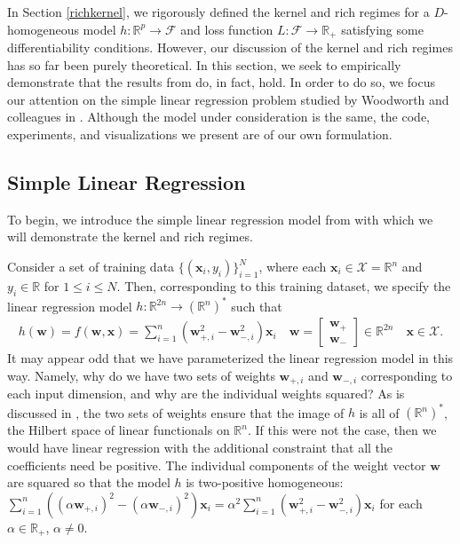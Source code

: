 \documentclass{article}
\begin{document}
In Section \ref{richkernel}, we rigorously defined the kernel and rich regimes for a $D$-homogeneous model $h: \mathbb{R}^p \rightarrow \mathcal{F}$ and loss function $L: \mathcal{F} \rightarrow \mathbb{R}_+$ satisfying some differentiability conditions. However, our discussion of the kernel and rich regimes has so far been purely theoretical. In this section, we seek to empirically demonstrate that the results from \cite{chizat2018lazy} do, in fact, hold. In order to do so, we focus our attention on the simple linear regression problem studied by Woodworth and colleagues in \cite{woodworth2020kernel}. Although the model under consideration is the same, the code, experiments, and visualizations we present are of our own formulation.

\subsection{Simple Linear Regression}\label{linregmodel}

To begin, we introduce the simple linear regression model from \cite{woodworth2020kernel} with which we will demonstrate the kernel and rich regimes.

Consider a set of training data $\{ (\boldsymbol{x}_i, y_i)\}_{i=1}^N$, where each $\boldsymbol{x}_i \in \mathcal{X} = \mathbb{R}^n$ and $y_i \in \mathbb{R}$ for $1 \leq i \leq N$. Then, corresponding to this training dataset, we specify the linear regression model $h: \mathbb{R}^{2n} \rightarrow (\mathbb{R}^n)^*$ such that
\begin{align}\label{linreg}
    h(\boldsymbol{w}) = f(\boldsymbol{w}, \boldsymbol{x}) = \sum_{i=1}^n(\boldsymbol{w}_{+, i}^2 - \boldsymbol{w}_{-, i}^2)\boldsymbol{x}_i \quad 
    \boldsymbol{w} = 
    \begin{bmatrix}
        \boldsymbol{w}_+ \\
        \boldsymbol{w}_-
    \end{bmatrix} 
    \in \mathbb{R}^{2n} \quad \boldsymbol{x} \in \mathcal{X}.
\end{align}
It may appear odd that we have parameterized the linear regression model in this way. Namely, why do we have two sets of weights $\boldsymbol{w}_{+, i}$ and $\boldsymbol{w}_{-, i}$ corresponding to each input dimension, and why are the individual weights squared? As is discussed in \cite{woodworth2020kernel}, the two sets of weights ensure that the image of $h$ is all of $(\mathbb{R}^n)^*$, the Hilbert space of linear functionals on $\mathbb{R}^n$. If this were not the case, then we would have linear regression with the additional constraint that all the coefficients need be positive. The individual components of the weight vector $\boldsymbol{w}$ are squared so that the model $h$ is two-positive homogeneous: $\sum_{i=1}^n((\alpha \boldsymbol{w}_{+, i})^2 - (\alpha \boldsymbol{w}_{-, i})^2)\boldsymbol{x}_i = \alpha^2\sum_{i=1}^n(\boldsymbol{w}_{+, i}^2 - \boldsymbol{w}_{-, i}^2)\boldsymbol{x}_i$ for each $\alpha \in \mathbb{R}_+$, $\alpha \neq 0$.
\end{document}
